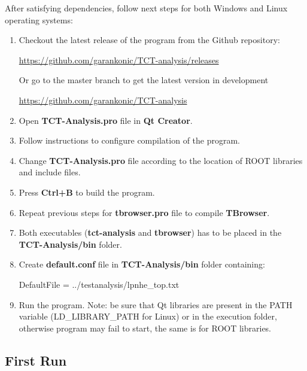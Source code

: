 \documentclass[12pt,oneside,notitlepage,abstracton,a4paper]{scrartcl}
\begin{document}
After satisfying dependencies, follow next steps for both Windows and Linux operating systems:
\begin{enumerate}
\item Checkout the latest release of the program from the Github repository:
\begin{displayquote}
\url{https://github.com/garankonic/TCT-analysis/releases}
\end{displayquote}
Or go to the master branch to get the latest version in development
\begin{displayquote}
\url{https://github.com/garankonic/TCT-analysis}
\end{displayquote}
\item Open \textbf{TCT-Analysis.pro} file in \textbf{Qt Creator}.
\item Follow instructions to configure compilation of the program.
\item Change \textbf{TCT-Analysis.pro} file according to the location of ROOT libraries and include files.
\item Press \textbf{Ctrl+B} to build the program.
\item Repeat previous steps for \textbf{tbrowser.pro} file to compile \textbf{TBrowser}.
\item Both executables (\textbf{tct-analysis} and \textbf{tbrowser}) has to be placed in the \textbf{TCT-Analysis/bin} folder. 
\item Create \textbf{default.conf} file in \textbf{TCT-Analysis/bin} folder containing:
\begin{displayquote}
DefaultFile = ../testanalysis/lpnhe\_top.txt
\end{displayquote}
\item Run the program. Note: be sure that Qt libraries are present in the PATH variable (LD\_LIBRARY\_PATH for Linux) or in the execution folder, otherwise program may fail to start, the same is for ROOT libraries.
\end{enumerate}

\subsection{First Run}\label{usage:first_run}
\end{document}
